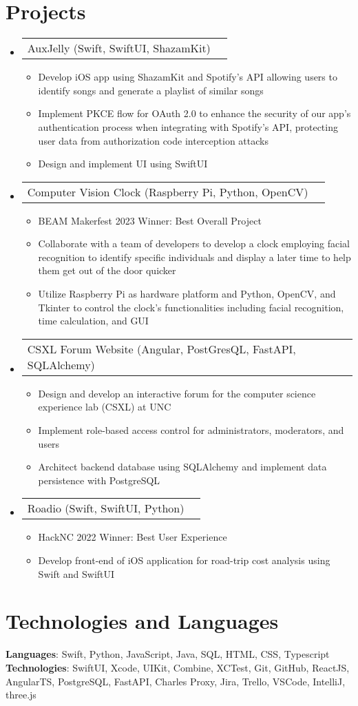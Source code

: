 \documentclass[letterpaper,11pt]{article}
\makeatletter
\newcommand{\resumeItem}[1]{
  \item\small{{#1}}
}
\newcommand{\resumeProjectHeading}[2]{
    \item
    \begin{tabular*}{0.97\textwidth}{l@{\extracolsep{\fill}}r}
      \small#1 & #2 \\
    \end{tabular*}\vspace{-7pt}
}
\newcommand{\resumeSubHeadingListStart}{\begin{itemize}[leftmargin=0.15in, label={}]}
\newcommand{\resumeSubHeadingListEnd}{\end{itemize}}
\newcommand{\resumeItemListStart}{\begin{itemize}}
\newcommand{\resumeItemListEnd}{\end{itemize}\vspace{-5pt}}
\makeatother
\begin{document}
\section{Projects}
  \resumeSubHeadingListStart
    \resumeProjectHeading{AuxJelly (Swift, SwiftUI, ShazamKit)}{}
      \resumeItemListStart
        \resumeItem{Develop iOS app using ShazamKit and Spotify's API allowing users to identify songs and generate a playlist of similar songs}
        \resumeItem{Implement PKCE flow for OAuth 2.0 to enhance the security of our app's authentication process when integrating with Spotify's API, protecting user data from authorization code interception attacks}
        \resumeItem{Design and implement UI using SwiftUI}
      \resumeItemListEnd
    \resumeProjectHeading{Computer Vision Clock (Raspberry Pi, Python, OpenCV)}{}
      \resumeItemListStart
        \resumeItem{BEAM Makerfest 2023 Winner: Best Overall Project}
        \resumeItem{Collaborate with a team of developers to develop a clock employing facial recognition to identify specific individuals and display a later time to help them get out of the door quicker}
        \resumeItem{Utilize Raspberry Pi as hardware platform and Python, OpenCV, and Tkinter to control the clock's functionalities including facial recognition, time calculation, and GUI}
      \resumeItemListEnd
    \resumeProjectHeading{CSXL Forum Website (Angular, PostGresQL, FastAPI, SQLAlchemy)}{}
      \resumeItemListStart
        \resumeItem{Design and develop an interactive forum for the computer science experience lab (CSXL) at UNC}
        \resumeItem{Implement role-based access control for administrators, moderators, and users}
        \resumeItem{Architect backend database using SQLAlchemy and implement data persistence with PostgreSQL}
      \resumeItemListEnd
    \resumeProjectHeading{Roadio (Swift, SwiftUI, Python)}{}
      \resumeItemListStart
        \resumeItem{HackNC 2022 Winner: Best User Experience}
        \resumeItem{Develop front-end of iOS application for road-trip cost analysis using Swift and SwiftUI}
      \resumeItemListEnd
  \resumeSubHeadingListEnd

\section{Technologies and Languages}
  \begin{itemize}[leftmargin=0.15in, label={}]
    \small{\item{
      \textbf{Languages}{: Swift, Python, JavaScript, Java, SQL, HTML, CSS, Typescript} \\
      \textbf{Technologies}{: SwiftUI, Xcode, UIKit, Combine, XCTest, Git, GitHub, ReactJS, AngularTS, PostgreSQL, FastAPI, Charles Proxy, Jira, Trello, VSCode, IntelliJ, three.js}
    }}
  \end{itemize}

\end{document}
